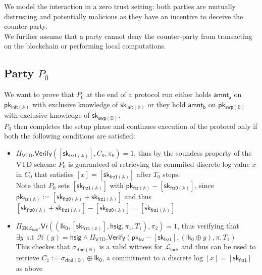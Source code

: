 \documentclass{article}      	%
\begin{document}
We model the interaction in a zero trust setting: both parties are mutually distrusting and potentially malicious as they have an incentive to deceive the counter-party. \\
We further assume that a party cannot deny the counter-party from transacting on the blockchain or performing local computations.

\subsection{Party $P_0$}
We want to prove that $P_0$ at the end of a protocol run either holds $\mathsf{amnt_a}$ on $\mathsf{pk_{init(\mathbb{A})}}$ with exclusive knowledge of $\mathsf{sk_{init(\mathbb{A})}}$ or they hold $\mathsf{amnt_b}$ on $\mathsf{pk_{swp(\mathbb{B})}}$ with exclusive knowledge of $\mathsf{sk_{swp(\mathbb{B})}}$. \\

$P_0$ then completes the setup phase and continues execution of the protocol only if both the following conditions are satisfied: 
\begin{itemize}
\item $\Pi_{\mathsf{VTD}}.\mathsf{Verify}([\mathsf{sk_{frz1(\mathbb{A})}}], C_0, \pi_0) = 1$, thus by the soundess property of the VTD scheme $P_0$ is guaranteed of retrieving the commited discrete log value $x$ in $C_0$ that satisfies $[x] = [\mathsf{sk_{frz1(\mathbb{A})}}]$ after $T_0$ steps. \\
Note that $P_0$ sets ${[\mathsf{sk_{frz1(\mathbb{A})}}]}$ with $\mathsf{pk_{frz(\mathbb{A})}} - [\mathsf{sk_{frz0(\mathbb{A})}}]$, since $\mathsf{pk_{frz(\mathbb{A})}} := [\mathsf{sk_{frz0(\mathbb{A})}} + \mathsf{sk_{frz1(\mathbb{A})}}]$ and thus $[\mathsf{sk_{frz0(\mathbb{A})}} + \mathsf{sk_{frz1(\mathbb{A})}}] - [\mathsf{sk_{frz0(\mathbb{A})}}] = [\mathsf{sk_{frz1(\mathbb{A})}}]$
\item $\Pi_{\mathsf{ZK}\mathcal{L}_{\mathsf{lock}}}.\mathsf{Vr}((\mathsf{lk_0}, {[\mathsf{sk_{frz1(\mathbb{A})}}]}, \mathsf{hsig}, \pi_1, T_1), \pi_2) = 1$, thus verifying that 
    $\exists y \:\: \text{s.t} \:\: \mathcal{H}(y) = \mathsf{hsig} \land \Pi_\mathsf{VTD}.\mathsf{Verify}(\mathsf{pk_{frz}} - [\mathsf{sk_{frz1}}], (\mathsf{lk_0} \oplus y), \pi, T_1)$ \\
    This checkes that $\sigma_\mathsf{rfnd(\mathbb{B})}$ is a valid witness for $\mathcal{L}_{\mathsf{lock}}$ and thus can be used to retrieve $C_1 := \sigma_\mathsf{rfnd(\mathbb{B})} \oplus \mathsf{lk_0}$, a commitment to a discrete log $[x] = [\mathsf{sk_{frz1}}]$ as above
\end{itemize}
\end{document}
